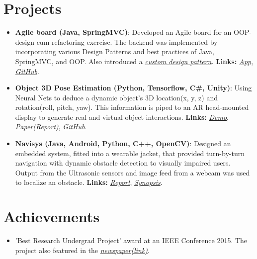 \documentclass[letterpaper,11pt]{article}
\newcommand{\resumeItem}[2]{
  \linespread{1.1}
  \item\small{
      \textbf{#1}{: #2}
    }
}
\newcommand{\resumePoint}[1]{
  \linespread{1.2}
  \item\small{#1}
}
\newcommand{\resumeSubItem}[2]{\resumeItem{#1}{#2}\vspace{-4pt}}
\newcommand{\resumeSubHeadingListStart}{\begin{itemize}[leftmargin=*]}
\newcommand{\resumeSubHeadingListEnd}{\end{itemize}\vspace{-14pt}}
\begin{document}
%

\section{Projects}
  \resumeSubHeadingListStart
    \resumeSubItem{Agile board (Java, SpringMVC)}
      {Developed an Agile board for an OOP-design cum refactoring exercise. The backend was implemented by incorporating various Design Patterns and best practices of Java, SpringMVC, and OOP. Also introduced a \href{https://github.com/nikhilsu/Agile-board/blob/master/src/main/java/com/prorg/helper/result/Response.java}{\emph{custom design pattern}}. \textbf{Links:}
      \href{https://prorg.herokuapp.com}{\textit{App}}, \href{https://github.com/nikhilsu/Agile-board}{\textit{GitHub}}.}
    \resumeSubItem{Object 3D Pose Estimation (Python, Tensorflow, C\#, Unity)}
      {Using Neural Nets to deduce a dynamic object\rq s 3D location(x, y, z) and rotation(roll, pitch, yaw). This information is piped to an AR head-mounted display to generate real and virtual object interactions. \textbf{Links:}
      \href{https://drive.google.com/file/d/1kCepKQxR73tUTLuvmd1YL3sIbj1GxDdc/view?usp=sharing}{\textit{Demo}}, \href{https://drive.google.com/file/d/1mRwSJ8p2-g-gtBGl1A8seRB8SojWQphm/view?usp=sharing}{\textit{Paper(Report)}}, \href{https://github.com/nikhilsu/Object-location-detection}{\textit{GitHub}}.}
    \resumeSubItem{Navisys (Java, Android, Python, C++, OpenCV)}
      {Designed an embedded system, fitted into a wearable jacket, that provided turn-by-turn navigation with dynamic obstacle detection to visually impaired users.  Output from the Ultrasonic sensors and image feed from a webcam was used to localize an obstacle. \textbf{Links:}
      \href{https://drive.google.com/file/d/1bFHeZ7-7uwZ0spir3YQ7r0maWdLteEtu/view?usp=sharing}{\textit{Report}},
      \href{https://drive.google.com/file/d/1JWB67U2jjTG7cXZFVjRPVGKsv-rRhgUQ/view?usp=sharing}{\textit{Synopsis}}.}
    \resumeSubHeadingListEnd

\vspace{5pt}
\section{Achievements}
\vspace{-5pt}
  \resumeSubHeadingListStart
    \resumePoint{'Best Research Undergrad Project' award at an IEEE Conference 2015. The project also featured in the \href{https://drive.google.com/open?id=0B0vNhKZyi8qyam1fQ3lfaE1hMkE}{\emph{newspaper(link)}}.}
  \resumeSubHeadingListEnd
\end{document}
